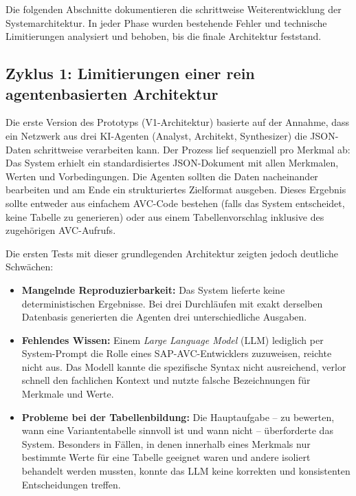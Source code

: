 Die folgenden Abschnitte dokumentieren die schrittweise Weiterentwicklung der Systemarchitektur. In jeder Phase wurden bestehende Fehler und technische Limitierungen analysiert und behoben, bis die finale Architektur feststand.

\subsection{Zyklus 1: Limitierungen einer rein agentenbasierten Architektur}
\label{subsec:zyklus_1_llm_limitierungen}

Die erste Version des Prototyps (V1-Architektur) basierte auf der Annahme, dass ein Netzwerk aus drei \ac{KI}-Agenten (Analyst, Architekt, Synthesizer) die JSON-Daten schrittweise verarbeiten kann. Der Prozess lief sequenziell pro Merkmal ab: Das System erhielt ein standardisiertes JSON-Dokument mit allen Merkmalen, Werten und Vorbedingungen. Die Agenten sollten die Daten nacheinander bearbeiten und am Ende ein strukturiertes Zielformat ausgeben. Dieses Ergebnis sollte entweder aus einfachem \ac{AVC}-Code bestehen (falls das System entscheidet, keine Tabelle zu generieren) oder aus einem Tabellenvorschlag inklusive des zugehörigen \ac{AVC}-Aufrufs.

Die ersten Tests mit dieser grundlegenden Architektur zeigten jedoch deutliche Schwächen:

\begin{itemize}
    \item \textbf{Mangelnde Reproduzierbarkeit:} Das System lieferte keine deterministischen Ergebnisse. Bei drei Durchläufen mit exakt derselben Datenbasis generierten die Agenten drei unterschiedliche Ausgaben.
    \item \textbf{Fehlendes Wissen:} Einem \textit{Large Language Model} (\ac{LLM}) lediglich per System-Prompt die Rolle eines SAP-AVC-Entwicklers zuzuweisen, reichte nicht aus. Das Modell kannte die spezifische Syntax nicht ausreichend, verlor schnell den fachlichen Kontext und nutzte falsche Bezeichnungen für Merkmale und Werte.
    \item \textbf{Probleme bei der Tabellenbildung:} Die Hauptaufgabe – zu bewerten, wann eine Variantentabelle sinnvoll ist und wann nicht – überforderte das System. Besonders in Fällen, in denen innerhalb eines Merkmals nur bestimmte Werte für eine Tabelle geeignet waren und andere isoliert behandelt werden mussten, konnte das \ac{LLM} keine korrekten und konsistenten Entscheidungen treffen.
\end{itemize}

